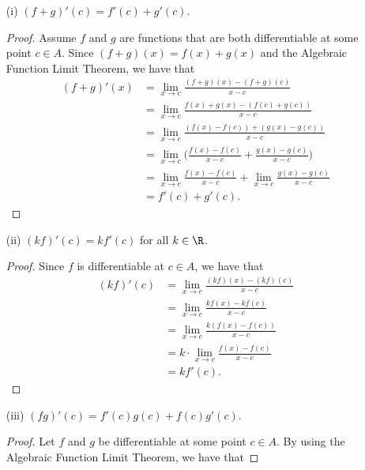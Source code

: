 \begin{enumerate}
    \item[(i)] \( (f+g)'(c) = f'(c) + g'(c)  \).
        \begin{proof}
        Assume \( f  \) and \( g  \) are functions that are both differentiable at some point \( c \in A  \). Since \( (f+g)(x) = f(x) + g(x)  \) and the Algebraic Function Limit Theorem, we have that
        \begin{align*}
            (f+g)'(x) &= \lim_{ x \to c } \frac{ (f+g)(x) - (f+g)(c) }{ x - c  }  \\
                      &= \lim_{ x \to c } \frac{ f(x) + g(x) - (f(c) + g(c) ) }{ x - c  } \\
                      &= \lim_{ x \to c  } \frac{ ( f(x) - f(c)) + (g(x) - g(c)) }{ x - c  } \\
                      &= \lim_{ x \to c  } \Big(  \frac{ f(x) - f(c)  }{ x - c  } + \frac{ g(x) - g(c)   }{ x - c  }  \Big) \\
                      &= \lim_{ x \to c  }  \frac{ f(x) - f(c)  }{ x - c  } + \lim_{ x \to c  } \frac{ g(x) - g(c)  }{ x - c  } \\
                      &= f'(c) + g'(c).
        \end{align*}
        \end{proof}
    \item[(ii)] \( (kf)'(c) = k f'(c)  \) for all \( k \in \R  \).
        \begin{proof}
        Since \( f  \) is differentiable at \( c \in A  \), we have that 
        \begin{align*}
            (kf)'(c) &= \lim_{ x \to c  } \frac{ (kf)(x) - (kf)(c)  }{ x - c  }  \\
                     &= \lim_{ x \to c  }  \frac{ k f(x) - k f(c)  }{ x - c  } \\
                     &= \lim_{ x \to c  } \frac{ k (f(x) - f(c) ) }{ x - c  } \\
                     &=k \cdot  \lim_{ x \to c  } \frac{ f(x) - f(c) }{ x - c  } \\
                     &= k f'(c).
        \end{align*}
        \end{proof}
    \item[(iii)] \( (fg)'(c)  = f'(c)g(c) + f(c)g'(c). \)
        \begin{proof}
        Let \( f  \) and \( g  \) be differentiable at some point \( c \in A  \).  By using the Algebraic Function Limit Theorem, we have that 

\end{proof}
\end{enumerate}
